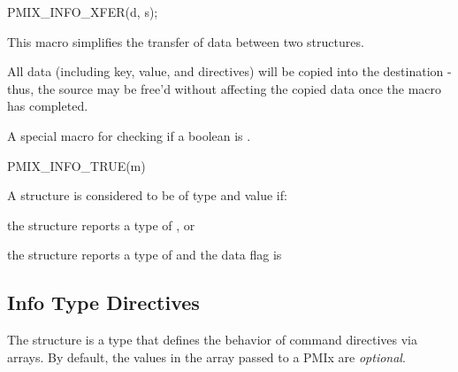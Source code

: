 \cspecificstart
\begin{codepar}
PMIX_INFO_XFER(d, s);
\end{codepar}
\cspecificend

\begin{arglist}
\end{arglist}

This macro simplifies the transfer of data between two structures.

\adviceuserstart
All data (including key, value, and directives) will be copied into the destination  - thus, the source  may be free'd without affecting the copied data once the macro has completed.
\adviceuserend



A special macro for checking if a boolean  is .

\cspecificstart
\begin{codepar}
PMIX_INFO_TRUE(m)
\end{codepar}
\cspecificend

\begin{arglist}
\end{arglist}

A  structure is considered to be of type  and value  if:

\begin{compactitemize}
    \item the structure reports a type of , or
    \item the structure reports a type of  and the data flag is 
\end{compactitemize}

\subsection{Info Type Directives}

The  structure is a  type that defines the behavior of command directives via  arrays.
By default, the values in the  array passed to a PMIx are \emph{optional}.


